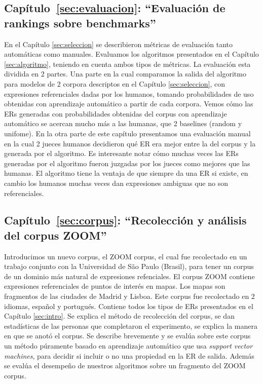 \subsection{Cap\'itulo~\ref{sec:evaluacion}: ``Evaluaci\'on de rankings sobre benchmarks''} 
En el Cap\'itulo \ref{sec:seleccion} se describieron m\'etricas de evaluaci\'on tanto autom\'aticas como manuales. Evaluamos los algoritmos presentados 
en el Cap\'itulo \ref{sec:algoritmo}, teniendo en cuenta ambos tipos de m\'etricas. La evaluaci\'on esta dividida en 2 partes. 
Una parte en la cual comparamos la salida del algoritmo para modelos de 2 corpora descriptos en el Cap\'itulo \ref{sec:seleccion}, con expresiones referenciales dadas por los humanos, tomando probabilidades de uso obtenidas con aprendizaje autom\'atico a partir de cada corpora. Vemos c\'omo las ERs generadas con probabilidades obtenidas del corpus con aprendizaje autom\'atico se acercan 
mucho m\'as a las humanas, que 2 baselines (random y unifome). En la otra parte de este cap\'itulo presentamos una evaluaci\'on manual en la cual 2 jueces humanos decidieron qu\'e ER era mejor entre la del corpus y la generada por el algoritmo. Es interesante notar c\'omo muchas 
veces las ERs generadas por el algoritmo fueron juzgadas por los jueces como mejores que las humanas. El algoritmo tiene la ventaja de que
 siempre da una ER si existe, en cambio los humanos muchas veces dan expresiones ambiguas que no son referenciales. 

\subsection{Cap\'itulo~\ref{sec:corpus}: ``Recolecci\'on y an\'alisis del corpus ZOOM''} Introducimos un nuevo corpus, 
el ZOOM corpus, el cual fue recolectado en un trabajo conjunto con la Universidad de S\~ao Paulo (Brasil), 
para tener un corpus de un dominio m\'as natural de expresiones refenciales. El corpus ZOOM contiene expresiones referenciales 
de puntos de inter\'es en mapas. Los mapas son fragmentos de las ciudades de Madrid y Lisboa. Este corpus fue recolectado en 2 idiomas, 
espa\~nol y portugu\'es. Contiene todos los tipos de ERs presentados en el Cap\'itulo \ref{sec:intro}. Se explica el m\'etodo de recolecci\'on del corpus, se dan estad\'isticas de las personas que completaron el 
experimento, se explica la manera en que se anot\'o el corpus. Se describe brevemente y se eval\'ua sobre este corpus un m\'etodo p\'uramente basado en aprendizaje autom\'atico que usa {\it support vector machines}, para decidir si incluir o no una propiedad en la ER de salida. Adem\'as se eval\'ua el desempe\~no de nuestros algoritmos sobre un fragmento del ZOOM corpus.

